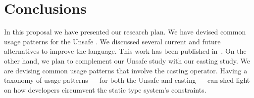 
\chapter{Conclusions}

In this proposal we have presented our research plan.
We have devised common usage patterns for the \java{} Unsafe \api.
We discussed several current and future alternatives to improve the
\java{} language.
This work has been published in~\citep{mastrangeloUseYourOwn2015}.
On the other hand, we plan to complement our Unsafe \api{} study with 
our casting study.
We are devising common usage patterns that involve the casting operator.
Having a taxonomy of usage patterns
--- for both the Unsafe \api{} and casting ---
can shed light on how \java{} developers circumvent
the static type system's constraints.

